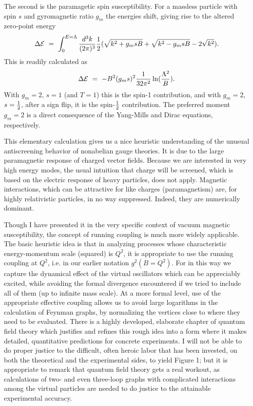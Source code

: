 \documentclass[aps,epsf]{revtex4}
\begin{document}
The second is the paramagetic spin
susceptibility. For a massless particle with spin $s$ and gyromagnetic
ratio $g_m$ the energies shift, giving rise to the altered zero-point
energy
\begin{equation}
\Delta {\cal E} ~=~ \int^{E=\Lambda}_0
{d^3k\over (2\pi)^3} {1\over 2} (\sqrt {k^2 + g_m s B} + \sqrt{k^2 -
g_msB} - 2 \sqrt {k^2}).\label{eq:eshift}
\end{equation}
This is readily
calculated as
\begin{equation}
\Delta {\cal E} ~=~ - B^2 (g_ms)^2
{1\over 32 \pi^2} \ln ({\Lambda^2\over B}).
\label{eq:enum}
\end{equation}
With $g_m = 2$, $s=1$ (and $T=1$) this
is the spin-1 contribution, and with $g_m =2$, $s = {1\over 2}$, after
a sign flip, it is the spin-${1\over 2}$ contribution.  The preferred
moment $g_m = 2$ is a direct consequence of the Yang-Mills and Dirac
equations, respectively. 

This elementary calculation gives us a nice
heuristic understanding of the unusual antiscreening behavior of
nonabelian gauge theories.  It is due to the large paramagnetic
response of charged vector fields.  Because we are interested in very
high energy modes, the usual intuition that charge will be screened,
which is based on the electric response of heavy particles, does not
apply.  Magnetic interactions, which can be attractive for like
charges (paramagnetism) are, for highly relativistic particles, in no
way suppressed.  Indeed, they are numerically dominant.  

Though I
have presented it in the very specific context of vacuum magnetic
susceptibility, the concept of running coupling is much more widely
applicable.  The basic heuristic idea is that in analyzing processes
whose characteristic energy-momentum scale (squared) is $Q^2$, it is
appropriate to use the running coupling at $Q^2$, i.e. in our earlier
notation $g^2(B = Q^2)$.  For in this way we capture the dynamical
effect of the virtual oscillators which can be appreciably excited,
while avoiding the formal divergence encountered if we tried to
include all of them (up to infinite mass scale).  At a more formal
level, use of the appropriate effective coupling allows us to avoid
large logarithms in the calculation of Feynman graphs, by normalizing
the vertices close to where they need to be evaluated.  There is a
highly developed, elaborate chapter of quantum field theory which
justifies and refines this rough idea into a form where it makes
detailed, quantitative predictions for concrete experiments.  I will
not be able to do proper justice to the difficult, often heroic labor
that has been invested, on both the theoretical and the experimental
sides, to yield Figure 1; but it is appropriate to remark that quantum
field theory gets a real workout, as calculations of two- and even
three-loop graphs with complicated interactions among the virtual
particles are needed to do justice to the attainable experimental
accuracy.  
\end{document}
